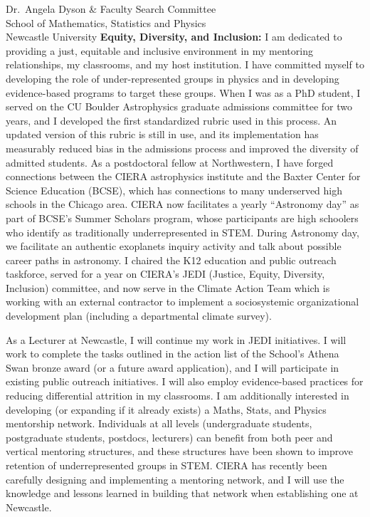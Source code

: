 \documentclass[12pt, a4paper]{letter}
\begin{document}
\begin{letter}{
        Dr.~Angela Dyson \& Faculty Search Committee \\
        School of Mathematics, Statistics and Physics \\
        Newcastle University}
    \textbf{Equity, Diversity, and Inclusion:} I am dedicated to providing a just, equitable and inclusive environment in my mentoring relationships, my classrooms, and my host institution.
    I have committed myself to developing the role of under-represented groups in physics and in developing evidence-based programs to target these groups.
    When I was as a PhD student, I served on the CU Boulder Astrophysics graduate admissions committee for two years, and I developed the first standardized rubric used in this process.
    An updated version of this rubric is still in use, and its implementation has measurably reduced bias in the admissions process and improved the diversity of admitted students.
    As a postdoctoral fellow at Northwestern, I have forged connections between the CIERA astrophysics institute and the Baxter Center for Science Education (BCSE), which has connections to many underserved high schools in the Chicago area.
    CIERA now facilitates a yearly ``Astronomy day'' as part of BCSE's Summer Scholars program, whose participants are high schoolers who identify as traditionally underrepresented in STEM.
    During Astronomy day, we facilitate an authentic exoplanets inquiry activity and talk about possible career paths in astronomy.
    I chaired the K12 education and public outreach taskforce, served for a year on CIERA's JEDI (Justice, Equity, Diversity, Inclusion) committee, and now serve in the Climate Action Team which is working with an external contractor to implement a sociosystemic organizational development plan (including a departmental climate survey).

    As a Lecturer at Newcastle, I will continue my work in JEDI initiatives.
    I will work to complete the tasks outlined in the action list of the School's Athena Swan bronze award (or a future award application), and I will participate in existing public outreach initiatives.
    I will also employ evidence-based practices for reducing differential attrition in my classrooms. 
    I am additionally interested in developing (or expanding if it already exists) a Maths, Stats, and Physics mentorship network.
    Individuals at all levels (undergraduate students, postgraduate students, postdocs, lecturers) can benefit from both peer and vertical mentoring structures, and these structures have been shown to improve retention of underrepresented groups in STEM.
    CIERA has recently been carefully designing and implementing a mentoring network, and I will use the knowledge and lessons learned in building that network when establishing one at Newcastle.




\end{letter}
\end{document}
